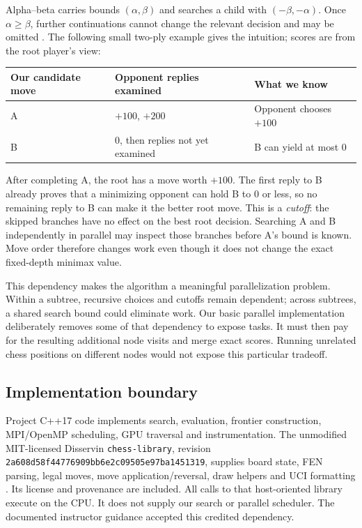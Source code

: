 \documentclass[11pt,a4paper]{article}
\newcommand{\code}[1]{\texttt{#1}}
\begin{document}
Alpha--beta carries bounds $(\alpha,\beta)$ and searches a child with
$(-\beta,-\alpha)$. Once $\alpha\geq\beta$, further continuations cannot change
the relevant decision and may be omitted \cite{knuth}. The following small
two-ply example gives the intuition; scores are from the root player's view:
\begin{center}\small
\begin{tabular}{@{}lll@{}}\toprule
Our candidate move & Opponent replies examined & What we know \\\midrule
A & $+100$, $+200$ & Opponent chooses $+100$ \\
B & $0$, then replies not yet examined & B can yield at most $0$ \\\bottomrule
\end{tabular}
\end{center}
After completing A, the root has a move worth $+100$. The first reply to B
already proves that a minimizing opponent can hold B to $0$ or less, so no
remaining reply to B can make it the better root move. This is a \emph{cutoff}:
the skipped branches have no effect on the best root decision. Searching A and
B independently in parallel may inspect those branches before A's bound is
known. Move order therefore changes work even though it does not change the
exact fixed-depth minimax value.

This dependency makes the algorithm a meaningful parallelization problem.
Within a subtree, recursive choices and cutoffs remain dependent; across
subtrees, a shared search bound could eliminate work. Our basic parallel
implementation deliberately removes some of that dependency to expose tasks.
It must then pay for the resulting additional node visits and merge exact
scores. Running unrelated chess positions on different nodes would not expose
this particular tradeoff.

\subsection{Implementation boundary}
Project C++17 code implements search, evaluation, frontier construction,
MPI/OpenMP scheduling, GPU traversal and instrumentation. The unmodified
MIT-licensed Disservin \code{chess-library}, revision
\code{2a608d58f44776909bb6e2c09505e97ba1451319}, supplies board state, FEN parsing,
legal moves, move application/reversal, draw helpers and UCI formatting
\cite{chesslib}. Its license and provenance are included. All calls to that
host-oriented library execute on the CPU. It does not supply our search or
parallel scheduler. The documented instructor guidance accepted this credited
dependency.
\end{document}
